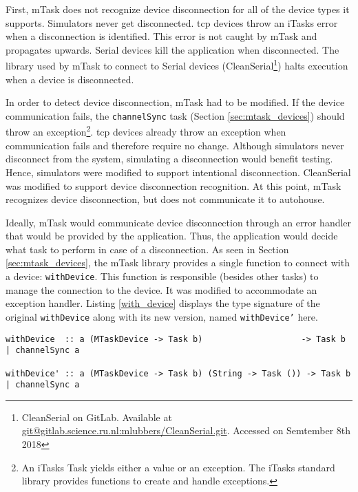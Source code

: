 First, \gls{mTask} does not recognize device disconnection for all of the device types it supports. Simulators never get disconnected. \acs{tcp} devices throw an \gls{iTasks} error when a disconnection is identified. This error is not caught by mTask and propagates upwards. Serial devices kill the application when disconnected. The library used by \gls{mTask} to connect to Serial devices (CleanSerial\footnote{CleanSerial on GitLab. Available at \url{git@gitlab.science.ru.nl:mlubbers/CleanSerial.git}. Accessed on Semtember 8th 2018}) halts execution when a device is disconnected. 

In order to detect device disconnection, \gls{mTask} had to be modified. If the device communication fails, the \texttt{channelSync} task (Section \ref{sec:mtask_devices}) should throw an exception\footnote{An \gls{iTasks} Task yields either a value or an exception. The \gls{iTasks} standard library provides functions to create and handle exceptions.}. \acs{tcp} devices already throw an exception when communication fails and therefore require no change. Although simulators never disconnect from the system, simulating a disconnection would benefit testing. Hence, simulators were modified to support intentional disconnection. CleanSerial was modified to support device disconnection recognition. At this point, \gls{mTask} recognizes device disconnection, but does not communicate it to \gls{autohouse}. 

Ideally, \gls{mTask} would communicate device disconnection through an error handler that would be provided by the application. Thus, the application would decide what task to perform in case of a disconnection. As seen in Section \ref{sec:mtask_devices}, the \gls{mTask} library provides a single function to connect with a device: \texttt{withDevice}. This function is responsible (besides other tasks) to manage the connection to the device. It was modified to accommodate an exception handler. Listing \ref{with_device} displays the type signature of the original \texttt{withDevice} along with its new version, named \texttt{withDevice'} here.

\begin{lstlisting}[caption=Change in mTask to support a device disconnection handler,captionpos=b,label=with_device]
withDevice  :: a (MTaskDevice -> Task b)                    -> Task b | channelSync a

withDevice' :: a (MTaskDevice -> Task b) (String -> Task ()) -> Task b | channelSync a
\end{lstlisting}

